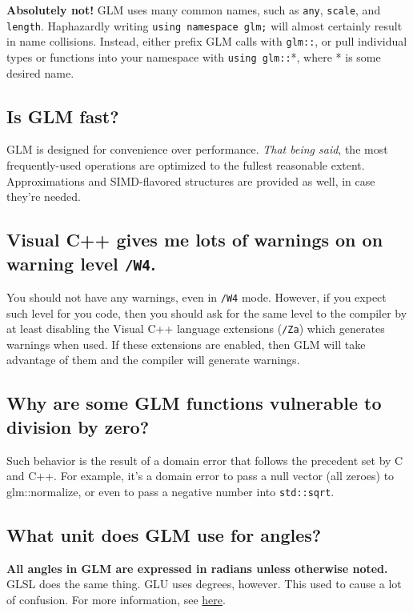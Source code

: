 \documentclass{scrartcl}
\numberwithin{figure}{subsection}
\begin{document}
\textbf{Absolutely not!}  GLM uses many common names, such as \verb|any|, \verb|scale|, and \verb|length|.  Haphazardly writing \verb|using namespace glm;| will almost certainly result in name collisions.  Instead, either prefix GLM calls with \verb|glm::|, or pull individual types or functions into your namespace with \verb|using glm::|*, where * is some desired name.

\subsection{Is GLM fast?}

GLM is designed for convenience over performance.  \emph{That being said}, the most frequently-used operations are optimized to the fullest reasonable extent.  Approximations and SIMD-flavored structures are provided as well, in case they're needed.

\subsection{Visual C++ gives me lots of warnings on on warning level \texttt{/W4}.}

You should not have any warnings, even in \verb|/W4| mode. However, if you expect such level for you code, then you should ask for the same level to the compiler by at least disabling the Visual C++ language extensions (\verb|/Za|) which generates warnings when used. If these extensions are enabled, then GLM will take advantage of them and the compiler will generate warnings.

\subsection{Why are some GLM functions vulnerable to division by zero?}

Such behavior is the result of a domain error that follows the precedent set by C and C++. For example, it's a domain error to pass a null vector (all zeroes) to glm::normalize, or even to pass a negative number into \verb|std::sqrt|.

\subsection{What unit does GLM use for angles?}

\textbf{All angles in GLM are expressed in radians unless otherwise noted.}  GLSL does the same thing.  GLU uses degrees, however.  This used to cause a lot of confusion.  For more information, see \href{http://www.g-truc.net/post-0693.html#menu}{here}.
\end{document}
